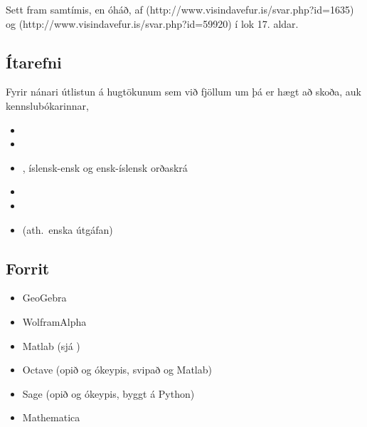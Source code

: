\documentclass[a4paper,10pt,icelandic]{sphinxmanual}
\begin{document}
Sett fram samtímis, en óháð, af
 (http://www.visindavefur.is/svar.php?id=1635) og
 (http://www.visindavefur.is/svar.php?id=59920) í lok 17. aldar.



\subsection{Ítarefni}
\label{\detokenize{kafli01:itarefni}}
Fyrir nánari útlistun á hugtökunum sem við fjöllum um þá er hægt að skoða,
auk kennslubókarinnar,
\begin{itemize}
\item {} 

\item {} 

\item {} 
, íslensk-ensk og ensk-íslensk orðaskrá

\item {} 

\item {} 

\item {} 
 (ath. enska útgáfan)

\end{itemize}


\subsection{Forrit}
\label{\detokenize{kafli01:forrit}}\begin{itemize}
\item {} 
GeoGebra 

\item {} 
WolframAlpha 

\item {} 
Matlab 
(sjá )

\item {} 
Octave  (opið og ókeypis, svipað og Matlab)

\item {} 
Sage   (opið og ókeypis, byggt á Python)

\item {} 
Mathematica 

\end{itemize}
\end{document}
